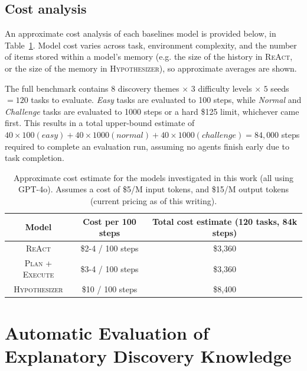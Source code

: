 \documentclass{article}
\begin{document}
\subsection{Cost analysis}
\label{sec:appendix_cost_analysis}

An approximate cost analysis of each baselines model is provided below, in Table~\ref{tab:cost-estimate}.  Model cost varies across task, environment complexity, and the number of items stored within a model's memory (e.g. the size of the history in \textsc{ReAct}, or the size of the memory in \textsc{Hypothesizer}), so approximate averages are shown. 

The full benchmark contains $8$ discovery themes $\times$ $3$ difficulty levels $\times$ $5$ seeds $= 120$ tasks to evaluate.  \textit{Easy} tasks are evaluated to 100 steps, while \textit{Normal} and \textit{Challenge} tasks are evaluated to 1000 steps or a hard \$125 limit, whichever came first.  This results in a total upper-bound estimate of $40\times100 (easy) + 40\times1000 (normal) + 40\times1000(challenge) = 84,000$ steps required to complete an evaluation run, assuming no agents finish early due to task completion.

\begin{table}[h!]
    \centering
    \footnotesize
    \caption{Approximate cost estimate for the models investigated in this work (all using GPT-4o). Assumes a cost of \$5/M input tokens, and \$15/M output tokens (current pricing as of this writing).}
    \label{tab:cost-estimate}
    \begin{tabular}{ccc}
    \toprule
    \textbf{Model}  &   \textbf{Cost per 100 steps}  &   \textbf{Total cost estimate (120 tasks, 84k steps)} \\
    \midrule
        \textsc{ReAct}               &  \$2-4 / 100 steps       &   \$3,360 \\
        \textsc{Plan + Execute}      &  \$3-4 / 100 steps       &   \$3,360 \\
        \textsc{Hypothesizer}        &  \$10  / 100 steps       &   \$8,400 \\
    \bottomrule
    \end{tabular}
\end{table}

\section{Automatic Evaluation of Explanatory Discovery Knowledge}
\label{sec:appendix-automatic-knowledge-evaluation}
\end{document}
